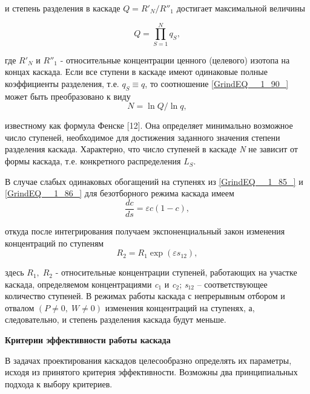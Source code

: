 и степень разделения в каскаде $Q=R'_{N}/R''_{1}$ достигает максимальной величины

\begin{equation} \label{GrindEQ__1_90_} 
Q=\prod _{S=1}^{N}q_{S},                      
\end{equation} 

где $R'_{N} $ и $R''_{{1}} $ - относительные концентрации ценного (целевого) изотопа на концах каскада. Если все ступени в каскаде имеют одинаковые полные коэффициенты разделения, т.е. $q_{S} \equiv q$, то соотношение \ref{GrindEQ__1_90_} может быть преобразовано к виду
\begin{equation} \label{GrindEQ__1_91_} 
N=\ln Q/\ln q,     
\end{equation} 

известному как формула Фенске [12]. Она определяет минимально возможное число ступеней, необходимое для достижения заданного значения степени разделения каскада. Характерно, что число ступеней в каскаде \textit{N} не зависит от формы каскада, т.е. конкретного распределения $L_{S} $.

В случае слабых одинаковых обогащений на ступенях из \ref{GrindEQ__1_85_} и \ref{GrindEQ__1_86_} для безотборного режима каскада имеем
\begin{equation} \label{GrindEQ__1_92_} 
\frac{dc}{ds} =\varepsilon c(1-c),    
\end{equation} 

откуда после интегрирования получаем экспоненциальный закон изменения концентраций по ступеням
\begin{equation} \label{GrindEQ__1_93_} 
R_{2} =R_{1} \exp (\varepsilon s_{12} ),   
\end{equation} 

здесь $R_{1} ,\; R_{2} $ - относительные концентрации ступеней, работающих на участке каскада, определяемом концентрациями \textit{c}${}_{1}$ и \textit{c}${}_{2}$; \textit{s}${}_{12}$ -- соответствующее количество ступеней. В режимах работы каскада с непрерывным отбором и отвалом $(P\ne 0,\; W\ne 0)$ изменения концентраций на ступенях, а, следовательно, и степень разделения каскада будут меньше.

\textbf{Критерии эффективности работы каскада}

В задачах проектирования каскадов целесообразно определять их параметры, исходя из принятого критерия эффективности. Возможны два принципиальных подхода к выбору критериев.

